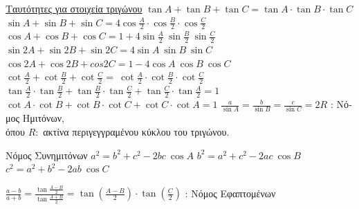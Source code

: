 \documentclass[12pt]{article}
\begin{document}
\begin{flushleft}
	\uline{ \textgreek{Ταυτότητες για στοιχεία τριγώνου}} \linebreak 
	\textbullet \quad $\displaystyle \tan A + \tan B + \tan C = \tan A \cdot \tan B \cdot \tan C $ \linebreak 
	\textbullet \quad $\displaystyle \sin A + \sin B + \sin C = 4\cos \frac{A}{2} \cdot \cos \frac{B}{2} \cdot \cos \frac{C}{2} $ \linebreak 
	\textbullet \quad $\displaystyle \cos A + \cos B + \cos C = 1 + 4\sin \frac{A}{2} \ \sin \frac{B}{2} \ \sin \frac{C}{2} $ \linebreak 
	\textbullet \quad $\displaystyle \sin 2A + \sin 2B + \sin 2C = 4 \sin A \ \sin B \ \sin C $ \linebreak 
	\textbullet \quad $\displaystyle \cos 2A + \cos 2B + cos2C = 1 - 4\cos A \ \cos B \ \cos C $ \linebreak 
	\textbullet \quad $\displaystyle \cot \frac{A}{2} + \cot \frac{B}{2} + \cot \frac{C}{2} = \ \cot \frac{A}{2} \cdot \cot \frac{B}{2} \cdot \cot \frac{C}{2} $ \linebreak 
	\textbullet \quad $\displaystyle \tan \frac{A}{2} \cdot \tan \frac{B}{2} + \tan \frac{B}{2} \cdot \tan \frac{C}{2} + \tan \frac{C}{2} \cdot \tan \frac{A}{2}  = 1 $ \linebreak 
	\textbullet \quad $\displaystyle \cot A \cdot \cot B + \cot B \cdot \cot C + \cot C \cdot \cot A = 1 $ \linebreak 
	\textbullet \quad $\displaystyle \frac{a}{\sin A} = \frac{b}{\sin B} = \frac{c}{\sin C} = 2R $ \textgreek{: Νόμος Ημιτόνων,} \\ \textgreek{όπου} $R:$ \textgreek{ακτίνα περιγεγγραμένου κύκλου του τριγώνου.} \linebreak 

	\textgreek{Νόμος Συνημιτόνων} \linebreak	
	\textbullet \quad $\displaystyle a^2 = b^2 + c^2 -2bc\ \cos A $ \linebreak 
	\textbullet \quad $\displaystyle b^2 = a^2 + c^2 -2ac\ \cos B $ \linebreak 
	\textbullet \quad $\displaystyle c^2 = a^2 + b^2 -2ab \ \cos C $ \linebreak 
	
	\textbullet \quad $\displaystyle \frac{a-b}{a+ b} = \frac{\tan \frac{A-B}{2}}{\tan \frac{A+B}{2}} = \tan \left( \frac{A-B}{2} \right) \cdot \tan \left( \frac{C}{2} \right) $ \textgreek{: Νόμος Εφαπτομένων} \linebreak 
	

\end{flushleft}
\end{document}
